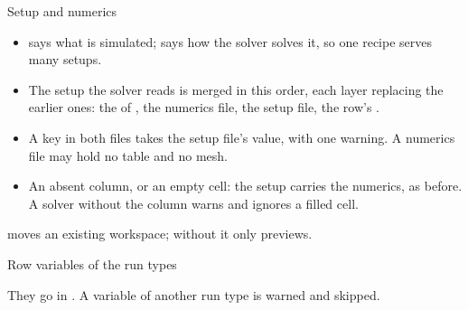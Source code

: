 \begin{frame}{Setup and numerics}
\begin{itemize}
  \item {} says what is simulated;  says how the
        solver solves it, so one recipe serves many setups.
  \item The setup the solver reads is merged in this order, each layer
        replacing the earlier ones: the \code{[defaults]} of
        , the numerics file, the setup file, the row's
        .
  \item A key in both files takes the setup file's value, with one warning. A
        numerics file may hold no \code{[solver]} table and no mesh.
  \item An absent column, \code{-} or an empty cell: the setup carries the
        numerics, as before. A solver without the column warns and ignores
        a filled cell.
\end{itemize}
\begin{takeaway}
moves an existing workspace; without  it only previews.\end{takeaway}
\end{frame}

\begin{frame}[fragile]{Row variables of the run types}
\vspace{1mm}
{\small They go in . A variable of another run type is
warned and skipped.\par}
\end{frame}

